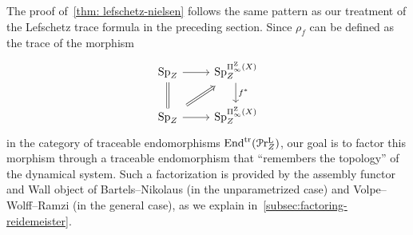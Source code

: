 The proof of~\cref{thm: lefschetz-nielsen} follows the same pattern as our treatment of the Lefschetz trace formula in the preceding section. Since $\rho_f$ can be defined as the trace of the morphism
\[
  \begin{tikzcd}
    \Sp_\base\arrow[d,equal] \arrow[r] & \Sp_\base^{\ani{\tset}[\base]}\arrow[d,"f^*"]\\
    \Sp_\base\arrow[r]\arrow[ru,Rightarrow, shorten <=5pt,shorten >=5pt] & \Sp_\base^{\ani{\tset}[\base]}
  \end{tikzcd}
\]
in the category of traceable endomorphisms $\mathrm{End}^{\mathrm{tr}} (\mathcal{P}\mathrm{r}^{\mathrm{L}}_{Z} )$, our goal is to factor this morphism through a traceable endomorphism that ``remembers the topology'' of the dynamical system. Such a factorization is provided by the assembly functor and Wall object of Bartels--Nikolaus (in the unparametrized case) and Volpe--Wolff--Ramzi (in the general case), as we explain in~\cref{subsec:factoring-reidemeister}.
